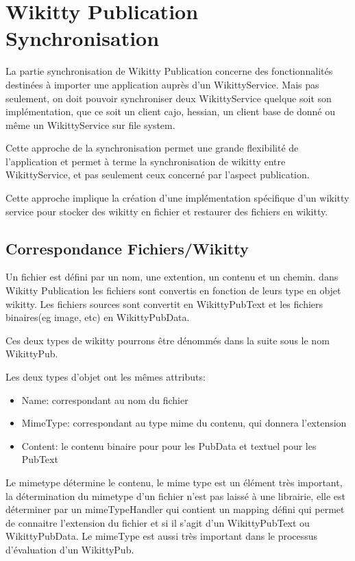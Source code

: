 \section{Wikitty Publication Synchronisation}

La partie synchronisation de Wikitty Publication concerne des fonctionnalités
destinées à importer une application auprès d'un WikittyService. Mais pas
seulement, on doit pouvoir synchroniser deux WikittyService quelque soit son
implémentation, que ce soit un client cajo, hessian, un client base de donné ou
même un WikittyService sur file system.

Cette approche de la synchronisation permet une grande flexibilité de
l'application et permet à terme la synchronisation de wikitty entre WikittyService,
 et pas seulement ceux concerné par l'aspect publication.

Cette approche implique la création d'une implémentation spécifique d'un wikitty
service pour stocker des wikitty en fichier et restaurer des fichiers en
wikitty.


\subsection{Correspondance Fichiers/Wikitty}

Un fichier est défini par un nom, une extention, un contenu et un chemin.
dans Wikitty Publication les fichiers sont convertis en fonction de leurs type
en objet wikitty. Les fichiers sources sont convertit en WikittyPubText et les
fichiers binaires(eg image, etc) en WikittyPubData.

Ces deux types de wikitty pourrons être dénommés dans la suite sous le nom
WikittyPub. 

Les deux types d'objet ont les mêmes attributs:
\begin{itemize}
\item Name: correspondant au nom du fichier
\item MimeType: correspondant au type mime du contenu, qui donnera l'extension
\item Content: le contenu binaire pour pour les PubData et textuel pour les
PubText
\end{itemize}

Le mimetype détermine le contenu, le mime type est un élément très important,
la détermination du mimetype d'un fichier n'est pas laissé à une librairie,
elle est déterminer par un mimeTypeHandler qui contient un mapping défini
qui permet de connaitre l'extension du fichier et si il s'agit d'un 
WikittyPubText ou WikittyPubData. Le mimeType est aussi très important dans 
le processus d'évaluation d'un WikittyPub.

